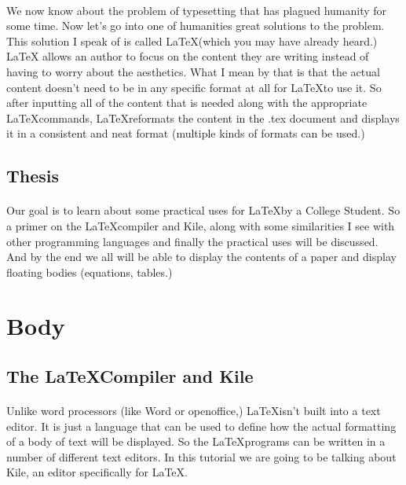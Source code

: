 \documentclass[letterpaper,12pt]{article}
\begin{document}
\paragraph{}
We now know about the problem of typesetting that has plagued humanity for some time. Now let's go into one of humanities
great solutions to the problem. This solution I speak of is called \LaTeX (which you may have already heard.) \LaTeX 
allows an author to focus on the content they are writing instead of having to worry about the aesthetics. What I mean by that
is that the actual content doesn't need to be in any specific format at all for \LaTeX to use it. So after inputting all of
the content that is needed along with the appropriate \LaTeX commands, \LaTeX reformats the content in the .tex document and
displays it in a consistent and neat format (multiple kinds of formats can be used.)

\subsection{Thesis}

\paragraph{}
Our goal is to learn about some practical uses for \LaTeX by a College Student. So a primer on the \LaTeX compiler and Kile, 
along with some similarities I see with other programming languages and finally the practical uses will be
discussed. And by the end we all will be able to display the contents of a paper and display floating bodies (equations, tables.)

\pagebreak

\section{Body}

\subsection{The \LaTeX Compiler and Kile}

\paragraph{}
Unlike word processors (like Word or openoffice,) \LaTeX isn't built into a text editor. It is just a language that 
can be used to define how the actual formatting of a body of text will be displayed. So the \LaTeX programs can be written
in a number of different text editors. In this tutorial we are going to be talking about Kile, an editor specifically for \LaTeX.
\end{document}
